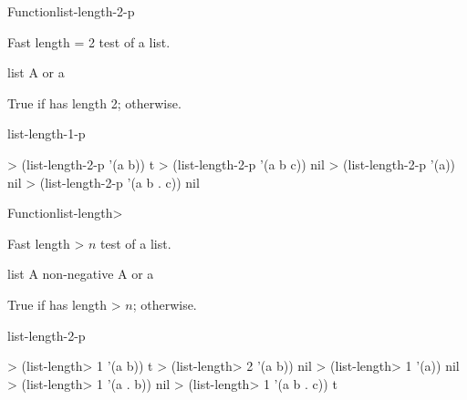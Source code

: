 \documentclass[10pt,twoside,english,pdftex]{article}
\begin{document}

\begin{functiondoc}{Function}{list-length-2-p}%
  {
    \returns{} }
%
%

\fnsyntax

\fnpurpose Fast length = 2 test of a list.

\fnpackage {}

\fnmodule {}

\fnargs
\begin{args}{list}
\arg[list] A  or a 
\end{args}

\fnreturns True if  has length 2; \nil{} otherwise.

\begin{alsos}{list-length-1-p}
\end{alsos}

\fnexamples
%
\W\supp
\begin{example}
> (list-length-2-p '(a b))
t
> (list-length-2-p '(a b c))
nil
> (list-length-2-p '(a))
nil
> (list-length-2-p '(a b . c))
nil
\end{example}

\end{functiondoc}


\begin{functiondoc}{Function}{list-length>}%
  {
    \returns{} }
%
%

\fnsyntax

\fnpurpose Fast length > $n$ test of a list.

\fnpackage {}

\fnmodule {}

\fnargs
\begin{args}{list}
\arg[n] A non-negative 
\arg[list] A  or a 
\end{args}

\fnreturns True if  has length > $n$; \nil{} otherwise.

\begin{alsos}{list-length-2-p}
\end{alsos}

\fnexamples
%
\W\supp
\begin{example}
> (list-length> 1 '(a b))
t
> (list-length> 2 '(a b))
nil
> (list-length> 1 '(a))
nil\goodpagebreak
> (list-length> 1 '(a . b))
nil
> (list-length> 1 '(a b . c))
t
\end{example}

\end{functiondoc}
\end{document}
